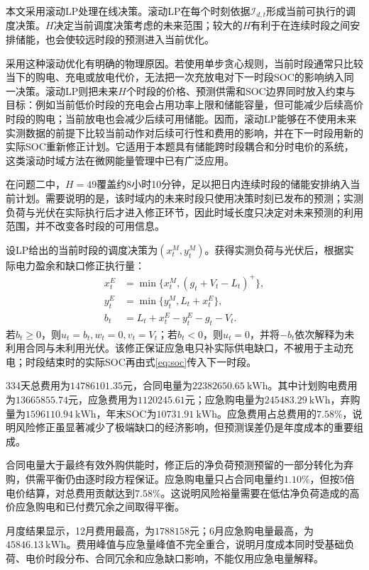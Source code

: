 \documentclass[UTF8,12pt,a4paper]{ctexart}
\theoremstyle{remark}
\begin{document}
本文采用滚动LP处理在线决策。滚动LP在每个时刻依据$\mathcal I_{d,t}$形成当前可执行的调度决策。$H$决定当前调度决策考虑的未来范围；较大的$H$有利于在连续时段之间安排储能，也会使较远时段的预测进入当前优化。

采用这种滚动优化有明确的物理原因。若使用单步贪心规则，当前时段通常只比较当下的购电、充电或放电代价，无法把一次充放电对下一时段SOC的影响纳入同一决策。滚动LP则把未来$H$个时段的价格、预测供需和SOC边界同时放入约束与目标：例如当前低价时段的充电会占用功率上限和储能容量，但可能减少后续高价时段的购电；当前放电也会减少后续可用储能。因而，滚动LP能够在不使用未来实测数据的前提下比较当前动作对后续可行性和费用的影响，并在下一时段用新的实际SOC重新修正计划。它适用于本题具有储能跨时段耦合和分时电价的系统，这类滚动时域方法在微网能量管理中已有广泛应用\cite{silvente2015rolling,elkazaz2020ems}。

在问题二中，$H=49$覆盖约8小时10分钟，足以把日内连续时段的储能安排纳入当前计划。需要说明的是，该时域内的未来时段只使用决策时刻已发布的预测；实测负荷与光伏在实际执行后才进入修正环节，因此时域长度只决定对未来预测的利用范围，并不改变各时段的可用信息。

设LP给出的当前时段的调度决策为$(x_t^M,y_t^M)$。获得实测负荷与光伏后，根据实际电力盈余和缺口修正执行量：
\begin{align}
x_t^E&=\min\{x_t^M,(g_t+V_t-L_t)^+\},\label{eq:clip-charge}\\
y_t^E&=\min\{y_t^M,L_t+x_t^E\},\label{eq:clip-discharge}\\
b_t&=L_t+x_t^E-y_t^E-g_t-V_t.\label{eq:clip-gap}
\end{align}
若$b_t\ge0$，则$u_t=b_t,w_t=0,v_t=V_t$；若$b_t<0$，则$u_t=0$，并将$-b_t$依次解释为未利用合同与未利用光伏。该修正保证应急电只补实际供电缺口，不被用于主动充电；时段结束时的实际SOC再由式\eqref{eq:soc}传入下一时段。

334天总费用为$14786101.35$元，合同电量为$22382650.65\ \mathrm{kWh}$。其中计划购电费用为$13665855.74$元，应急费用为$1120245.61$元；应急购电量为$245483.29\ \mathrm{kWh}$，弃购量为$1596110.94\ \mathrm{kWh}$，年末SOC为$10731.91\ \mathrm{kWh}$。应急费用占总费用的$7.58\%$，说明风险修正虽显著减少了极端缺口的经济影响，但预测误差仍是年度成本的重要组成。

合同电量大于最终有效外购供能时，修正后的净负荷预测预留的一部分转化为弃购，供需平衡仍由逐时段方程保证。应急购电量只占合同电量约$1.10\%$，但按5倍电价结算，对总费用贡献达到$7.58\%$。这说明风险裕量需要在低估净负荷造成的高价应急购电和已付费冗余之间取得平衡。

月度结果显示，12月费用最高，为$1788158$元；6月应急购电量最高，为$45846.13\ \mathrm{kWh}$。费用峰值与应急量峰值不完全重合，说明月度成本同时受基础负荷、电价时段分布、合同冗余和应急缺口影响，不能仅用应急电量解释。
\end{document}
